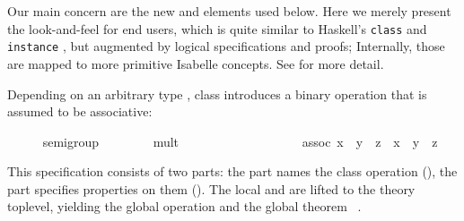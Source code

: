 \begin{isabellebody}
\begin{isamarkuptext}
  Our main concern are the new \isa{{\isasymCLASS}}
  and \isa{{\isasymINSTANCE}} elements used below.
  Here we merely present the
  look-and-feel for end users, which is quite similar to Haskell's
  \texttt{class} and \texttt{instance} \cite{hall96type}, but
  augmented by logical specifications and proofs;
  Internally, those are mapped to more primitive Isabelle concepts.
  See \cite{haftmann_wenzel2006classes} for more detail.%
\end{isamarkuptext}%
\isamarkuptrue%
%
\isamarkuptrue%
%
\begin{isamarkuptext}%
Depending on an arbitrary type \isa{{\isasymalpha}}, class  introduces a binary operation \isa{{\isasymcirc}} that is
  assumed to be associative:%
\end{isamarkuptext}%
\isamarkuptrue%
\ \ \ \ \isamarkupfalse%
\ semigroup\ {\isacharequal}\isanewline
\ \ \ \ \ \ \ mult\ {\isacharcolon}{\isacharcolon}\ {\isachardoublequoteopen}{\isasymalpha}\ {\isasymRightarrow}\ {\isasymalpha}\ {\isasymRightarrow}\ {\isasymalpha}{\isachardoublequoteclose}\ \ \ \ {\isacharparenleft}\ {\isachardoublequoteopen}\isactrlloc {\isasymotimes}{\isachardoublequoteclose}\ {}{}{\isacharparenright}\isanewline
\ \ \ \ \ \ \ assoc{\isacharcolon}\ {\isachardoublequoteopen}{\isacharparenleft}x\ \isactrlloc {\isasymotimes}\ y{\isacharparenright}\ \isactrlloc {\isasymotimes}\ z\ {\isacharequal}\ x\ \isactrlloc {\isasymotimes}\ {\isacharparenleft}y\ \isactrlloc {\isasymotimes}\ z{\isacharparenright}{\isachardoublequoteclose}%
\begin{isamarkuptext}%
\noindent This \isa{{\isasymCLASS}} specification consists of two
  parts: the  part names the class operation (\isa{{\isasymFIXES}}), the  part specifies properties on them
  (\isa{{\isasymASSUMES}}).  The local \isa{{\isasymFIXES}} and \isa{{\isasymASSUMES}} are lifted to the theory toplevel, yielding the global
  operation  and the
  global theorem ~.%

\end{isamarkuptext}
\end{isabellebody}

